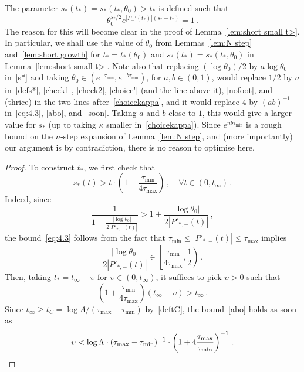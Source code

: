 \documentclass[AHL,Unicode,longabstracts,published]{cedram}
\let\oldforall\forall
\renewcommand*{\forall}{\mathrel{\oldforall}}
\begin{document}
\begin{rema}\label{choice}
The parameter $s_*(t_*)=s_*(t_*,\theta_0) > t_*$ is defined such that
\begin{equation}\label{defs*}
\theta_0^{s_*/2} e^{\left|P_-'(t_*)\right|\left(s_* - t_*\right)} = 1 \,.
\end{equation}
The reason for this will become clear in the proof of Lemma~\ref{lem:short small t>}. In particular, we shall use the value of $\theta_0$ from Lemmas~\ref{lem:N step} and~\ref{lem:short growth} for $t_*=t_*(\theta_0)$ and $s_*(t_*)=s_*(t_*,\theta_0)$ in Lemma~\ref{lem:short small t>}. Note also that replacing $(\log \theta_0)/2$ by $a \log \theta_0$ in~\eqref{s*} and taking $\theta_0\in (e^{- \tau_{\min}},e^{- b\tau_{\min}})$, for $a, b \in (0,1)$, would replace $1/2$ by $a$ in~\eqref{defs*}, \eqref{check1}, \eqref{check2}, \eqref{choice'} (and the line above it), \eqref{nofoot}, and (thrice) in the two lines after~\eqref{choicekappa}, and it would replace $4$ by $(ab)^{-1}$ in~\eqref{eq:4.3}, \eqref{abo}, and~\eqref{soon}. Taking $a$ and $b$ close to $1$, this would give a larger value for $s_*$ (up to taking $\kappa$ smaller in~\eqref{choicekappa}). Since $e^{n b\tau_{\min}}$ is a rough bound on the $n$-step expansion of Lemma~\ref{lem:N step}, and (more importantly) our argument is by contradiction, there is no reason to optimise here.
\end{rema}


\begin{proof}
To construct $t_*$, we first check that
\begin{equation}\label{eq:4.3}
s_*(t)>t \cdot \left(1+ \frac{\tau_{\min}}{4\tau_{\max}} \right)\, , \quad 
\forall t\in (0 , t_\infty)
\, .
\end{equation}
Indeed, since
\begin{equation}\label{check1}
\frac 1{1-\frac{|\log \theta_0|}{2| P'_{*,-}(t)|}} > 1+\frac{|\log \theta_0|}{2| P'_{*,-}(t)|}\,,
\end{equation}
the bound~\eqref{eq:4.3} follows from the fact that $ \tau_{\min} \le | P'_{*,-}(t)|\le \tau_{\max}$ implies
\begin{equation}\label{check2}
\frac{|\log \theta_0 |}{2\left| P'_{*,-}(t)\right|}
\in \left[\frac{\tau_{\min}}{4\tau_{\max}},\frac 1 {2} \right)\,.
\end{equation}
Then, taking $t_*=t_\infty-\upsilon$ for $\upsilon \in (0,t_\infty)$, it suffices to pick $\upsilon>0$ such that
\begin{equation}\label{abo}
\left(1+ \frac{\tau_{\min}}{4\tau_{\max}} \right)\left(t_\infty-\upsilon \right) > t_\infty \,.
\end{equation}
Since $t_\infty \ge t_C=\log \Lambda/ (\tau_{\max}-\tau_{\min})$ by~\eqref{deftC}, the bound~\eqref{abo} holds as soon as
\begin{equation}\label{soon}
\upsilon < \log \Lambda \cdot (\tau_{\max}-\tau_{\min})^{-1}\cdot
\left(1+ 4\frac {\tau_{\max}}{\tau_{\min}}\right)^{-1} \,.\qedhere
\end{equation}
\end{proof}\let\qed\relax
\end{document}
